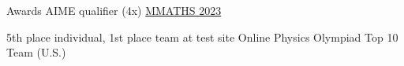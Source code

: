 \begin{rubric}{Awards}
    \entry*[2020-2023]AIME qualifier (4x)
    \entry*[Oct 2023] \href{https://www.mmaths.org/}{MMATHS 2023}
        \par 5th place individual, 1st place team at test site
    \entry*[July 2023] Online Physics Olympiad Top 10 Team (U.S.)
\end{rubric}